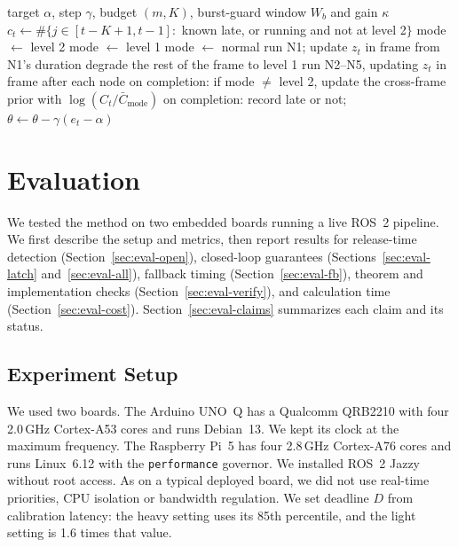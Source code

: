 \documentclass[acmsmall,screen]{acmart}
\newcommand{\Wl}{$\mathcal{W}$}
\begin{document}
\begin{algorithm}[t]
\caption{Proposed method with rule \Wl, per frame $t$}\label{alg:mon}
\small
\begin{algorithmic}[1]
\Require target $\alpha$, step $\gamma$, budget $(m,K)$, burst-guard window $W_b$ and gain $\kappa$
\State $c_t\gets\#\{j\in[t-K+1,t-1]:$ known late, or running and not at level 2$\}$ \label{ln:c}
 mode $\gets$ level 2 \label{ln:l2}
 mode $\gets$ level 1
\Else{} mode $\gets$ normal \EndIf
\State run N1; update $z_t$ in frame from N1's duration
 degrade the rest of the frame to level 1 \EndIf
\State run N2--N5, updating $z_t$ in frame after each node
\State on completion: if mode $\ne$ level 2, update the cross-frame prior with $\log(C_t/\bar C_{\text{mode}})$ 
\State on completion: record late or not; $\theta\gets\theta-\gamma(e_t-\alpha)$
\end{algorithmic}
\end{algorithm}

\section{Evaluation}\label{sec:eval}

We tested the method on two embedded boards running a live ROS~2 pipeline. We first describe the setup and metrics, then report results for release-time detection (Section~\ref{sec:eval-open}), closed-loop guarantees (Sections~\ref{sec:eval-latch} and~\ref{sec:eval-all}), fallback timing (Section~\ref{sec:eval-fb}), theorem and implementation checks (Section~\ref{sec:eval-verify}), and calculation time (Section~\ref{sec:eval-cost}). Section~\ref{sec:eval-claims} summarizes each claim and its status.

\subsection{Experiment Setup}

We used two boards. The Arduino UNO~Q has a Qualcomm QRB2210 with four 2.0\,GHz Cortex-A53 cores and runs Debian~13. We kept its clock at the maximum frequency. The Raspberry Pi~5 has four 2.8\,GHz Cortex-A76 cores and runs Linux~6.12 with the \texttt{performance} governor. We installed ROS~2 Jazzy without root access. As on a typical deployed board, we did not use real-time priorities, CPU isolation or bandwidth regulation. We set deadline $D$ from calibration latency: the heavy setting uses its 85th percentile, and the light setting is 1.6 times that value.
\end{document}
